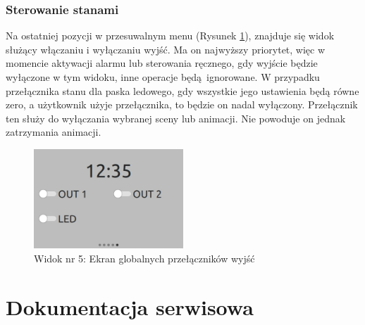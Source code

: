 \documentclass[12pt, eng, twoside, openany, final]{mgr}
\begin{document}
        \subsection{Sterowanie stanami}
        Na ostatniej pozycji w przesuwalnym menu (Rysunek \ref{fig:view6}), znajduje się widok służący włączaniu i wyłączaniu wyjść. Ma on najwyższy priorytet, więc w momencie aktywacji alarmu lub sterowania ręcznego, gdy wyjście będzie wyłączone w tym widoku, inne operacje będą ignorowane. W przypadku przełącznika stanu dla paska ledowego, gdy wszystkie jego ustawienia będą równe zero, a użytkownik użyje przełącznika, to będzie on nadal wyłączony. Przełącznik ten służy do wyłączania wybranej sceny lub animacji. Nie powoduje on jednak zatrzymania animacji.
            \begin{figure}[H]
            \begin{center}
                \includegraphics[width=0.5\textwidth]{ui_global.jpg}
                \caption{Widok nr 5: Ekran globalnych przełączników wyjść} \label{fig:view6}
            \end{center}
            \end{figure}
    
    
    \newpage

\chapter{Dokumentacja serwisowa}
\thispagestyle{fancy}
\end{document}
